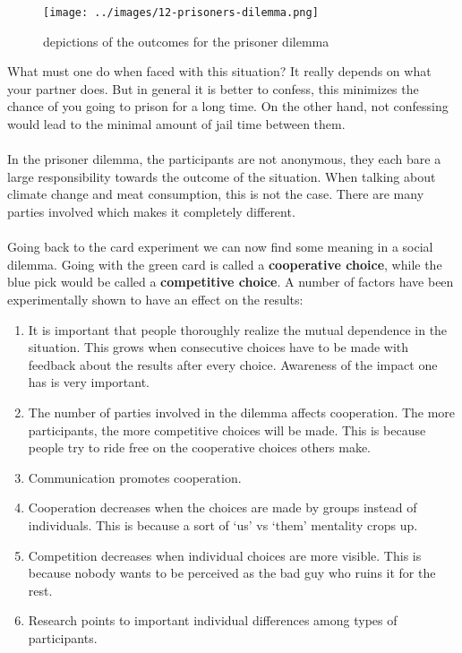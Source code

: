 \documentclass[../summary.tex]{subfiles}
\begin{document}
			\begin{figure}[h]
				\centering
				\texttt{[image: ../images/12-prisoners-dilemma.png]}
				\caption{depictions of the outcomes for the prisoner dilemma}
				\label{fig:12-prisoners-dilemma}
			\end{figure}
			What must one do when faced with this situation? It really depends on what your partner does. But in general it is better to confess, this minimizes the chance of you going to prison for a long time. On the other hand, not confessing would lead to the minimal amount of jail time between them. 
			\\\\
			In the prisoner dilemma, the participants are not anonymous, they each bare a large responsibility towards the outcome of the situation. When talking about climate change and meat consumption, this is not the case. There are many parties involved which makes it completely different.
			\\\\
			\newpage
			Going back to the card experiment we can now find some meaning in a social dilemma. Going with the green card is called a \textbf{cooperative choice}, while the blue pick would be called a \textbf{competitive choice}. A number of factors have been experimentally shown to have an effect on the results:
			\begin{enumerate}
				\item It is important that people thoroughly realize the mutual dependence in the situation. This grows when consecutive choices have to be made with feedback about the results after every choice. Awareness of the impact one has is very important. 
				\item The number of parties involved in the dilemma affects cooperation. The more participants, the more competitive choices will be made. This is because people try to ride free on the cooperative choices others make. 
				\item Communication promotes cooperation. 
				\item Cooperation decreases when the choices are made by groups instead of individuals. This is because a sort of `us' vs `them' mentality crops up. 
				\item Competition decreases when individual choices are more visible. This is because nobody wants to be perceived as the bad guy who ruins it for the rest.
				\item Research points to important individual differences among types of participants.
			\end{enumerate}
		\newpage
\end{document}
